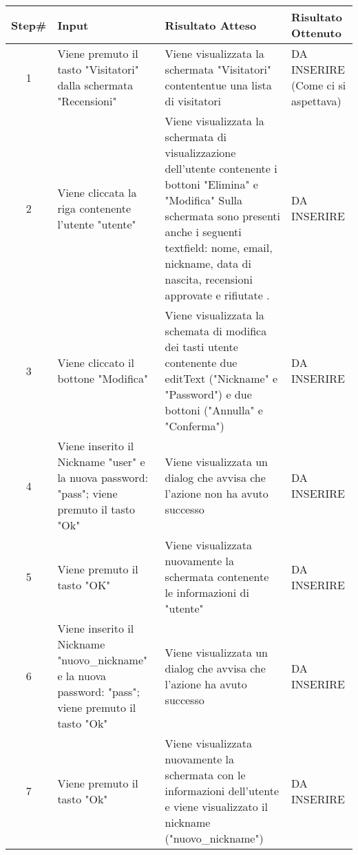 \begin{table}[H]
    \footnotesize
    \begin{tabularx}{\textwidth}{|c|X|X|X|}
        \hline
        Step\# & Input & Risultato Atteso & Risultato Ottenuto \\
        \hline
         1 & Viene premuto il tasto "Visitatori" dalla schermata "Recensioni" 
         & Viene visualizzata la schermata "Visitatori" contententue una lista di visitatori
         &DA INSERIRE (Come ci si aspettava)\\
          \hline
        2 & Viene cliccata la riga contenente l'utente "utente"
        & Viene visualizzata la schermata di visualizzazione dell'utente contenente i bottoni "Elimina" e "Modifica"
          Sulla schermata sono presenti anche i seguenti textfield: nome, email, nickname, data di nascita, recensioni approvate e rifiutate .
        & DA INSERIRE\\
         \hline 
        3 & Viene cliccato il bottone "Modifica"
         & Viene visualizzata la schemata di modifica dei tasti utente contenente due editText ("Nickname" e "Password") e
         due bottoni ("Annulla" e "Conferma")
         & DA INSERIRE\\
          \hline
        4 & Viene inserito il Nickname "user" e la nuova password: "pass"; viene premuto il tasto "Ok"
         & Viene visualizzata un dialog che avvisa che l'azione non ha avuto successo
         & DA INSERIRE\\
          \hline  
          5 & Viene premuto il tasto "OK"
          & Viene visualizzata nuovamente la schermata contenente le informazioni di "utente"
          & DA INSERIRE\\
          \hline      
        6 & Viene inserito il Nickname "nuovo_nickname" e la nuova password: "pass"; viene premuto il tasto "Ok"
         & Viene visualizzata un dialog che avvisa che l'azione ha avuto successo
         & DA INSERIRE\\
           \hline 
           7 & Viene premuto il tasto "Ok"
           & Viene visualizzata nuovamente la schermata con le informazioni dell'utente e
           viene visualizzato il nickname ("nuovo_nickname")
           & DA INSERIRE\\
             \hline                       
    \end{tabularx}
\end{table}
    
       
